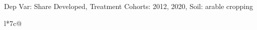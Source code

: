 \begin{table}[H]
\captionlistentry[table]{}
\label{table:beaver_land_class_DVis_land_class_3_SCg13_SSAC}
\scriptsize %
Dep Var: Share Developed, Treatment Cohorts: 2012, 2020, Soil: arable cropping \\
\begin{threeparttable}
\begin{tabulary}{\textwidth}{l*{7}{c}@{}}
\toprule \toprule
\noalign{\smallskip}
\noalign{\smallskip}
\midrule \bottomrule
\end{tabulary}
\medskip
\end{threeparttable}
\end{table}
